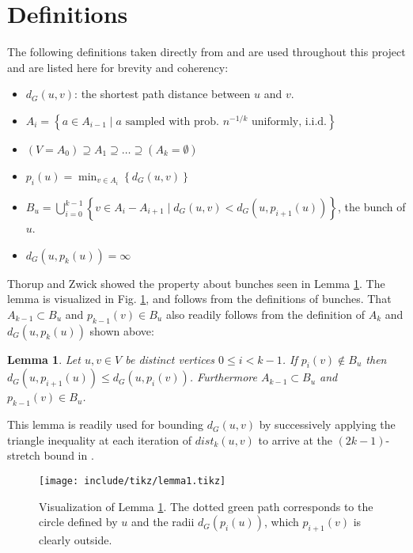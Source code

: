 \documentclass[12pt]{article}
\newtheorem{lem}[thm]{Lemma}
\begin{document}
\section{Definitions}
The following definitions taken directly from \cite{Thorup2005} and \cite{Wulff2013} are used throughout this project and are listed here for brevity and coherency:
\begin{itemize}
\item $d_{G}(u,v)$: the shortest path distance between $u$ and $v$.
\item $A_i = \left\{ a \in A_{i-1} \; | \; a \text{ sampled with prob. } n^{-1/k} \text{ uniformly, i.i.d.} \right\}$
\item $(V = A_0) \supseteq A_1 \supseteq \hdots \supseteq (A_k = \emptyset)$
\item $p_i(u) = \min_{v \in A_i} \left\{ d_{G}(u,v) \right\}$
\item $B_u=\bigcup_{i=0}^{k-1}\left\{ v \in A_i - A_{i+1} \; | \; d_{G}(u,v) < d_{G}(u, p_{i+1}(u)) \right\}$, the bunch of $u$.
\item $d_G(u,p_k(u))=\infty$
\end{itemize}
Thorup and Zwick showed the property about bunches seen in Lemma \ref{lem:onedeltaperiteration}. The lemma is visualized in Fig. \ref{fig:lemma1vis}, and follows from the definitions of bunches. That $A_{k-1} \subset B_u$ and $p_{k-1}(v) \in B_u$ also readily follows from the definition of $A_{k}$ and $d_G(u,p_k(u))$ shown above:
\\
\begin{lem}
Let $u,v \in V$ be distinct vertices $0 \leq i < k-1$. If $p_i(v) \not\in B_{u}$ then $d_G(u, p_{i+1}(u)) \leq d_G(u, p_i(v))$. Furthermore $A_{k-1} \subset B_u$ and $p_{k-1}(v) \in B_u$. \label{lem:onedeltaperiteration}
\end{lem}
This lemma is readily used for bounding $d_G(u,v)$ by successively applying the triangle inequality at each iteration of $dist_k(u,v)$ to arrive at the $(2k-1)$-stretch bound in \cite{Thorup2005}.

\begin{figure}[!hbt]
\centering
    \texttt{[image: include/tikz/lemma1.tikz]}%
\caption{Visualization of Lemma \ref{lem:onedeltaperiteration}. The dotted green path corresponds to the circle defined by $u$ and the radii $d_G(p_i(u))$, which $p_{i+1}(v)$ is clearly outside. \label{fig:lemma1vis}}
\end{figure}
\end{document}
